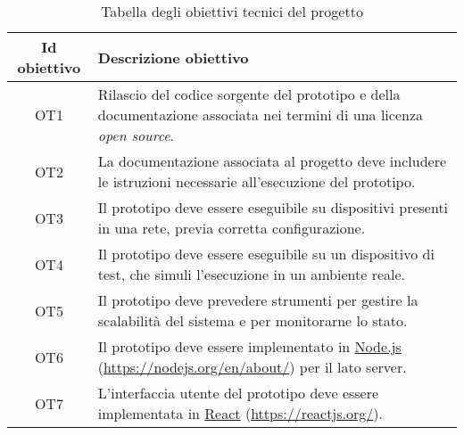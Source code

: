 \begin{table}[H]
\caption{Tabella degli obiettivi tecnici del progetto}
\label{tab:obiettivi-tecnici}
\begin{tabularx}{\linewidth}{|c|X|}
\hline
\textbf{Id obiettivo} & \textbf{Descrizione obiettivo} \\
\hline
\label{OT1} OT1 & Rilascio del codice sorgente del prototipo e della documentazione associata nei termini di una licenza \emph{open source}. \\
\hline
\label{OT2} OT2 & La documentazione associata al progetto deve includere le istruzioni necessarie all'esecuzione del prototipo. \\
\hline
\label{OT3} OT3 & Il prototipo deve essere eseguibile su dispositivi presenti in una rete, previa corretta configurazione. \\
\hline
\label{OT4} OT4 & Il prototipo deve essere eseguibile su un dispositivo di test, che simuli l'esecuzione in un ambiente reale. \\
\hline
\label{OT5} OT5 & Il prototipo deve prevedere strumenti per gestire la scalabilità del sistema e per monitorarne lo stato. \\
\hline
\label{OT6} OT6 & Il prototipo deve essere implementato in \href{https://nodejs.org/en/about/}{Node.js} (\url{https://nodejs.org/en/about/}) per il lato server. \\
\hline
\label{OT7} OT7 & L'interfaccia utente del prototipo deve essere implementata in \href{https://reactjs.org/}{React} (\url{https://reactjs.org/}). \\
\hline
\end{tabularx}
\end{table}
